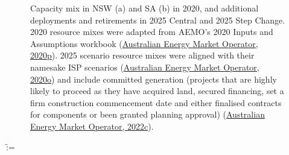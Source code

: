 \documentclass[12pt,a4paper,]{report}
\makeatletter
\newcounter{pandoccrossref@subfigures@footnote@counter}
\newenvironment{pandoccrossrefsubfigures}{%
\setcounter{pandoccrossref@subfigures@footnote@counter}{0}
\begin{figure}\centering%
\gdef\global@pandoccrossref@subfigures@footnotes{}%
\DeclareRobustCommand{\footnote}[1]{\footnotemark%
\stepcounter{pandoccrossref@subfigures@footnote@counter}%
\ifx\global@pandoccrossref@subfigures@footnotes\empty%
\gdef\global@pandoccrossref@subfigures@footnotes{{##1}}%
\else%
\g@addto@macro\global@pandoccrossref@subfigures@footnotes{, {##1}}%
\fi}}%
{\end{figure}%
\addtocounter{footnote}{-\value{pandoccrossref@subfigures@footnote@counter}}
\@for\f:=\global@pandoccrossref@subfigures@footnotes\do{\stepcounter{footnote}\footnotetext{\f}}%
\gdef\global@pandoccrossref@subfigures@footnotes{}}
\makeatother
\begin{document}
\begin{pandoccrossrefsubfigures}



\caption[Capacity mix in NSW and SA in 2020 and the two 2025 scenarios]{Capacity mix in NSW (a) and SA (b) in
2020, and additional deployments and retirements in 2025 Central and
2025 Step Change. 2020 resource mixes were adapted from AEMO's 2020
Inputs and Assumptions workbook
(\protect\hyperlink{ref-australianenergymarketoperator2020InputsAssumptions2020}{Australian
Energy Market Operator, 2020p}). 2025 scenario resource mixes were
aligned with their namesake ISP scenarios
(\protect\hyperlink{ref-australianenergymarketoperator2020ISPGeneration2020}{Australian
Energy Market Operator, 2020o}) and include committed generation
(projects that are highly likely to proceed as they have acquired land,
secured financing, set a firm construction commencement date and either
finalised contracts for components or been granted planning approval)
(\protect\hyperlink{ref-australianenergymarketoperatorGenerationInformation2022}{Australian
Energy Market Operator, 2022c}).}

\label{fig:capacities}

\end{pandoccrossrefsubfigures}
\end{document}
